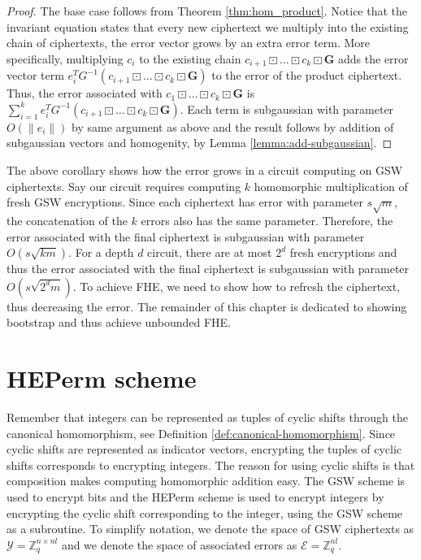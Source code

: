 \begin{proof}
    The base case follows from Theorem \ref{thm:hom_product}.
    Notice that the invariant equation states that every new ciphertext we multiply into the existing chain of ciphertexts, the error vector grows by an extra error term. More specifically, multiplying $c_i$ to the existing chain $c_{i+1} \boxdot \dots \boxdot c_k \boxdot \mathbf{G}$ adds the error vector term $e_i^TG^{-1}(c_{i+1} \boxdot \dots \boxdot c_k \boxdot \mathbf{G})$ to the error of the product ciphertext. Thus, the error associated with $c_1 \boxdot \dots \boxdot c_k \boxdot \mathbf{G}$ is $\sum_{i = 1}^k e_i^TG^{-1}(c_{i+1} \boxdot  \dots \boxdot c_k \boxdot \mathbf{G})$. Each term is subgaussian with parameter $O(\|e_i\|)$ by same argument as above and the result follows by addition of subgaussian vectors and homogenity, by Lemma \ref{lemma:add-subgaussian}.
\end{proof}
The above corollary shows how the error grows in a circuit computing on GSW ciphertexts. Say our circuit requires computing $k$ homomorphic multiplication of fresh GSW encryptions. Since each ciphertext has error with parameter $s\sqrt{m}$, the concatenation of the $k$ errors also has the same parameter. Therefore, the error associated with the final ciphertext is subgaussian with parameter $O(s\sqrt{km})$. For a depth $d$ circuit, there are at most $2^d$ fresh encryptions and thus the error associated with the final ciphertext is subgaussian with parameter $O(s\sqrt{2^dm})$. To achieve FHE, we need to show how to refresh the ciphertext, thus decreasing the error. The remainder of this chapter is dedicated to showing bootstrap and thus achieve unbounded FHE.

\section{HEPerm scheme}
Remember that integers can be represented as tuples of cyclic shifts through the canonical homomorphism, see Definition \ref{def:canonical-homomorphism}. Since cyclic shifts are represented as indicator vectors, encrypting the tuples of cyclic shifts corresponds to encrypting integers. The reason for using cyclic shifts is that composition makes computing homomorphic addition easy. The GSW scheme is used to encrypt bits and the HEPerm scheme is used to encrypt integers by encrypting the cyclic shift corresponding to the integer, using the GSW scheme as a subroutine. To simplify notation, we denote the space of GSW ciphertexts as $\mathcal{Y} = \mathbb{Z}_q^{n \times nl}$ and we denote the space of associated errors as $\mathcal{E} = \mathbb{Z}_q^{nl}$.

